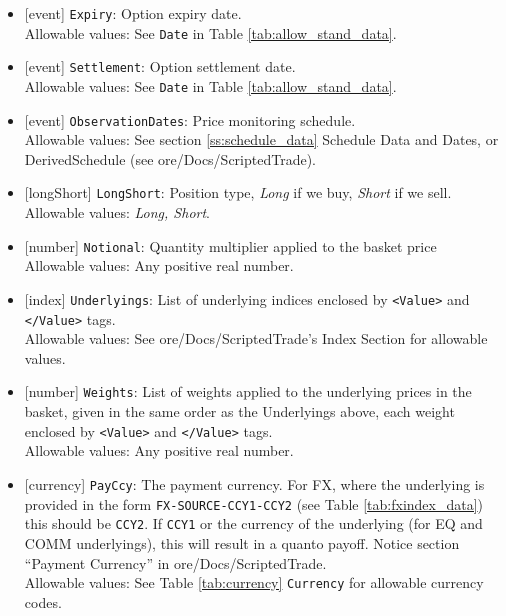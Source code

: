 \begin{itemize}
    \item{}[event] \lstinline!Expiry!: Option expiry date. \\
    Allowable values: See \lstinline!Date! in Table \ref{tab:allow_stand_data}.
    \item{}[event] \lstinline!Settlement!: Option settlement date. \\
    Allowable values: See \lstinline!Date! in Table \ref{tab:allow_stand_data}.
    \item{}[event] \lstinline!ObservationDates!: Price monitoring schedule. \\
    Allowable values: See section \ref{ss:schedule_data} Schedule Data and Dates, or DerivedSchedule (see ore/Docs/ScriptedTrade).
    \item{}[longShort] \lstinline!LongShort!: Position type,
          {\em Long} if we buy, {\em Short} if we sell.\\
    Allowable values: \emph{Long, Short}.
    \item{}[number] \lstinline!Notional!: Quantity multiplier applied to the basket price \\
          Allowable values: Any positive real number.
    \item{}[index] \lstinline!Underlyings!: List of underlying indices
          enclosed by {\tt <Value>} and {\tt </Value>} tags. \\
          Allowable values: See ore/Docs/ScriptedTrade's Index Section for allowable values.
    \item{}[number] \lstinline!Weights!: List of weights applied to the
          underlying prices in the basket, given in the same order as
          the Underlyings above, each weight enclosed by {\tt <Value>} and {\tt </Value>} tags.\\
          Allowable values: Any positive real number.
    \item{}[currency] \lstinline!PayCcy!: The payment currency. For FX, where the underlying is provided
      in the form \lstinline!FX-SOURCE-CCY1-CCY2! (see Table \ref{tab:fxindex_data}) this should
      be \lstinline!CCY2!. If \lstinline!CCY1! or the currency of the underlying (for EQ and
      COMM underlyings), this will result in a quanto payoff. Notice section ``Payment Currency'' in ore/Docs/ScriptedTrade. \\
        Allowable values: See Table \ref{tab:currency} \lstinline!Currency!  for allowable currency codes.
\end{itemize}

